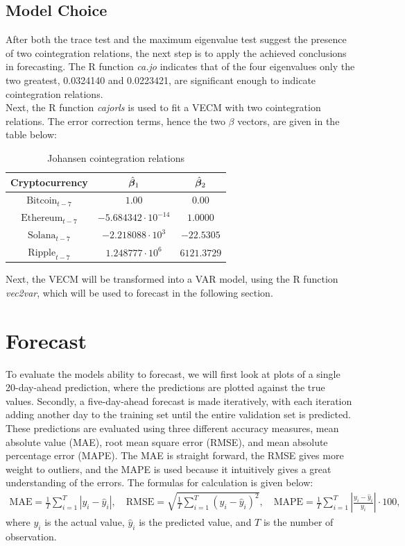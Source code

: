 \subsection{Model Choice}
After both the trace test and the maximum eigenvalue test suggest the presence of two cointegration relations, the next step is to apply the achieved conclusions in forecasting. The R function \textit{ca.jo} indicates that of the four eigenvalues only the two greatest, 0.0324140 and 0.0223421, are significant enough to indicate cointegration relations.\\
Next, the R function \textit{cajorls} is used to fit a VECM with two cointegration relations. The error correction terms, hence the two $\beta$ vectors, are given in the table below:\\
\begin{table}[h!]
\centering
\begin{tabular}{|c|c|c|}
\hline
\textbf{Cryptocurrency} & $\hat{\boldsymbol{\beta}}_1$ & $\hat{\boldsymbol{\beta}}_2$ \\ \hline
 $\text{Bitcoin}_{t-7}$  & $1.00$  & $0.00$      \\ \hline
 $\text{Ethereum}_{t-7}$  & $-5.684342 \cdot 10^{-14}$ & $1.0000$    \\\hline
 $\text{Solana}_{t-7}$  & $-2.218088 \cdot 10^3$ & $-22.5305$    \\ \hline
 $\text{Ripple}_{t-7}$  & $1.248777 \cdot 10^6$  & $6121.3729$   \\ \hline
\end{tabular}
\caption{Johansen cointegration relations}
\label{tab:ect_coefficients}
\end{table}

\noindent Next, the VECM will be transformed into a VAR model, using the R function \textit{vec2var}, which will be used to forecast in the following section.



\section{Forecast}
To evaluate the models ability to forecast, we will first look at plots of a single 20-day-ahead prediction, where the predictions are plotted against the true values. Secondly, a five-day-ahead forecast is made iteratively, with each iteration adding another day to the training set until the entire validation set is predicted. These predictions are evaluated using three different accuracy measures, mean absolute value (MAE), root mean square error (RMSE), and mean absolute percentage error (MAPE). The MAE is straight forward, the RMSE gives more weight to outliers, and the MAPE is used because it intuitively gives a great understanding of the errors. The formulas for calculation is given below:
\begin{align*}
    \text{MAE} = \frac{1}{T} \sum_{i=1}^{T} |y_i - \hat{y}_i|, \quad \text{RMSE} = \sqrt{\frac{1}{T} \sum_{i=1}^{T} (y_i - \hat{y}_i)^2}, \quad \text{MAPE} = \frac{1}{T} \sum_{i=1}^{T} \left| \frac{y_i - \hat{y}_i}{y_i} \right|\cdot 100,
\end{align*}
\noindent where $y_i$ is the actual value, $\hat{y}_i$ is the predicted value, and $T$ is the number of observation.

